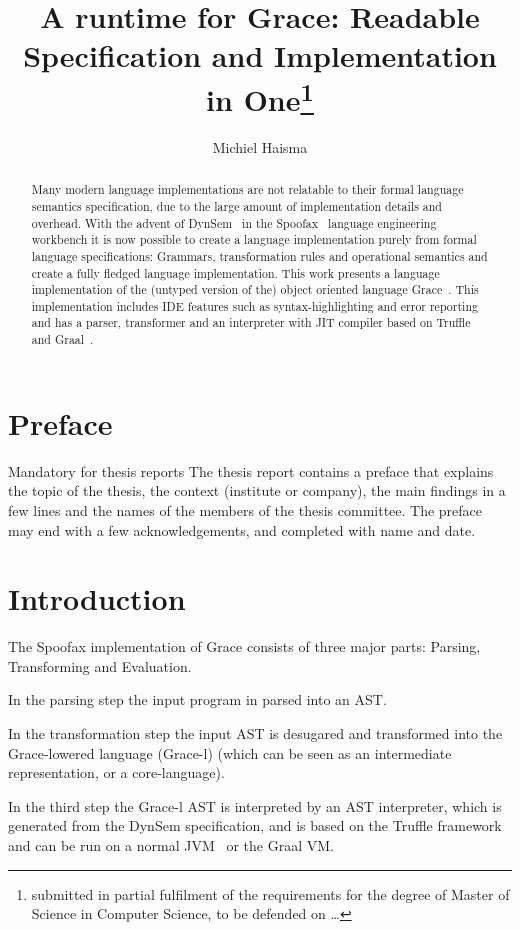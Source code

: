 \documentclass[a4paper,UKenglish]{lipics-v2016}
\title{A runtime for Grace: Readable Specification and Implementation in One\footnote{submitted in partial fulfilment of the requirements for the degree of Master of Science in Computer Science, to be defended on \dots }}
\author[1]{Michiel Haisma}
\affil[1]{Department of Programming Languages, Faculty EEMCS\\ Delft University of Technology, Mekelweg 4 Delft, The Netherlands\\
  \texttt{m.a.haisma@student.tudelft.nl}\\ Student number: 1512285}
\begin{document}
\maketitle

\begin{abstract}
Many modern language implementations are not relatable to their formal language semantics specification, due to the large amount of implementation details and overhead. With the advent of DynSem~\cite{vergu2015dynsem} in the Spoofax~\cite{Kats:2010:SLW:1869459.1869497} language engineering workbench it is now possible to create a language implementation purely from formal language specifications: Grammars, transformation rules and operational semantics and create a fully fledged language implementation. This work presents a language implementation of the (untyped version of the) object oriented language Grace~\cite{Black:2012:GAD:2384592.2384601, gracelang}. This implementation includes IDE features such as syntax-highlighting and error reporting and has a parser, transformer and an interpreter with JIT compiler based on Truffle~\cite{Wimmer:2012:TSR:2384716.2384723,Wurthinger:2012:SAI:2384577.2384587} and Graal~\cite{Wurthinger:2013:OVR:2509578.2509581}.
\end{abstract}

\section{Preface}
Mandatory for thesis reports
The thesis report contains a preface that explains the topic of the thesis, the context (institute or company), the main findings in a few lines and the names of the members of the thesis committee. The preface may end with a few acknowledgements, and completed with name and date.

\section{Introduction}
The Spoofax implementation of Grace consists of three major parts: Parsing, Transforming and Evaluation.

In the parsing step the input program in parsed into an AST.

In the transformation step the input AST is desugared and transformed into the Grace-lowered language (Grace-l) (which can be seen as an intermediate representation, or a core-language). 

In the third step the Grace-l AST is interpreted by an AST interpreter, which is generated from the DynSem specification, and is based on the Truffle framework and can be run on a normal JVM~\cite{jvm} or the Graal VM.
\end{document}
